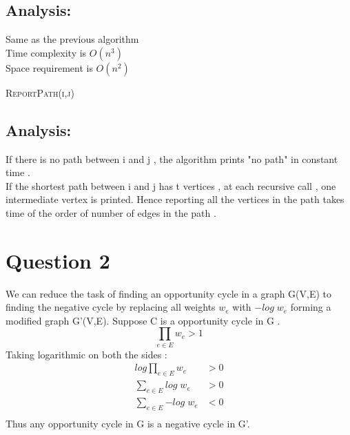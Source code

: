 \documentclass[11pt]{article}
\begin{document}
\subsection*{Analysis: }
Same as the previous algorithm\\
Time complexity is $O(n^3)$ \\
Space requirement is $O(n^2)$ \\

\begin{algorithm}
\caption{\textsc{ReportPath(i,j)}}
\end{algorithm}

\subsection*{Analysis: }
If there is no path between i and j , the algorithm prints "no path" in constant time . \\
If the shortest path between i and j has t vertices , at each recursive call , one intermediate vertex is printed.
Hence reporting all the vertices in the path takes time of the order of number of edges in the path .\\

\section*{Question 2}
We can reduce the task of finding an opportunity cycle in a graph G(V,E) to finding the negative cycle by replacing all weights $w_e$ with $-log \; w_e$
forming a modified graph G'(V,E). Suppose C is a opportunity cycle in G . 
\[ \prod_{e \in E} {w_e} > 1 \]
Taking logarithmic on both the sides :
\begin{align*}
log \prod_{e \in E} {w_e} &> 0 \\
\sum_{e \in E} {log \; w_e} &> 0 \\
\sum_{e \in E} {-log \; w_e} &< 0 \\
\end{align*}
Thus any opportunity cycle in G is a negative cycle in G'. 
\end{document}

